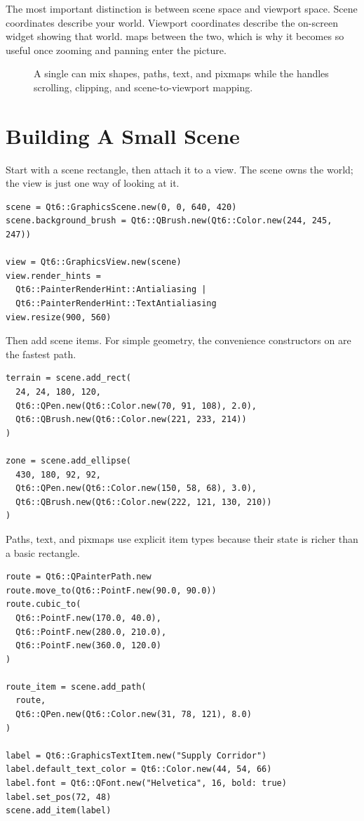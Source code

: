The most important distinction is between scene space and viewport space. Scene coordinates describe your world. Viewport coordinates describe the on-screen widget showing that world.  maps between the two, which is why it becomes so useful once zooming and panning enter the picture.

\begin{figure}[htbp]
  \centering
  \caption{A single  can mix shapes, paths, text, and pixmaps while the  handles scrolling, clipping, and scene-to-viewport mapping.}
\end{figure}

\section{Building A Small Scene}

Start with a scene rectangle, then attach it to a view. The scene owns the world; the view is just one way of looking at it.

\begin{lstlisting}[style=crystal]
scene = Qt6::GraphicsScene.new(0, 0, 640, 420)
scene.background_brush = Qt6::QBrush.new(Qt6::Color.new(244, 245, 247))

view = Qt6::GraphicsView.new(scene)
view.render_hints =
  Qt6::PainterRenderHint::Antialiasing |
  Qt6::PainterRenderHint::TextAntialiasing
view.resize(900, 560)
\end{lstlisting}

Then add scene items. For simple geometry, the convenience constructors on  are the fastest path.

\begin{lstlisting}[style=crystal]
terrain = scene.add_rect(
  24, 24, 180, 120,
  Qt6::QPen.new(Qt6::Color.new(70, 91, 108), 2.0),
  Qt6::QBrush.new(Qt6::Color.new(221, 233, 214))
)

zone = scene.add_ellipse(
  430, 180, 92, 92,
  Qt6::QPen.new(Qt6::Color.new(150, 58, 68), 3.0),
  Qt6::QBrush.new(Qt6::Color.new(222, 121, 130, 210))
)
\end{lstlisting}

Paths, text, and pixmaps use explicit item types because their state is richer than a basic rectangle.

\begin{lstlisting}[style=crystal]
route = Qt6::QPainterPath.new
route.move_to(Qt6::PointF.new(90.0, 90.0))
route.cubic_to(
  Qt6::PointF.new(170.0, 40.0),
  Qt6::PointF.new(280.0, 210.0),
  Qt6::PointF.new(360.0, 120.0)
)

route_item = scene.add_path(
  route,
  Qt6::QPen.new(Qt6::Color.new(31, 78, 121), 8.0)
)

label = Qt6::GraphicsTextItem.new("Supply Corridor")
label.default_text_color = Qt6::Color.new(44, 54, 66)
label.font = Qt6::QFont.new("Helvetica", 16, bold: true)
label.set_pos(72, 48)
scene.add_item(label)
\end{lstlisting}

